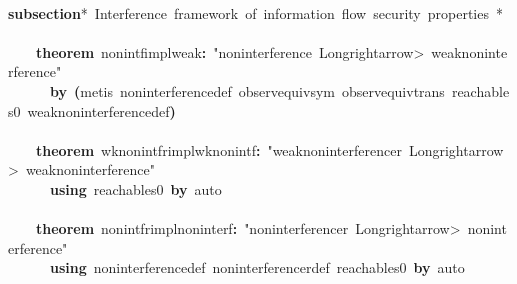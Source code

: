 \documentclass{article}
\newcommand{\syntaxCOMMENTC}[1]{\textcolor[rgb]{0.4,0.0,0.8}{#1}}
\newcommand{\syntaxKEYWORDA}[1]{\textcolor[rgb]{0.0,0.4,0.6}{\textbf{#1}}}
\newcommand{\syntaxLITERALA}[1]{\textcolor[rgb]{1.0,0.0,0.8}{#1}}
\newcommand{\syntaxOPERATOR}[1]{\textcolor[rgb]{0.0,0.0,0.0}{\textbf{#1}}}
\newcommand{\syntaxCOMMENTC}[1]{\textcolor[rgb]{0.4,0.0,0.8}{#1}}
\newcommand{\syntaxKEYWORDA}[1]{\textcolor[rgb]{0.0,0.4,0.6}{\textbf{#1}}}
\newcommand{\syntaxLITERALA}[1]{\textcolor[rgb]{1.0,0.0,0.8}{#1}}
\newcommand{\syntaxOPERATOR}[1]{\textcolor[rgb]{0.0,0.0,0.0}{\textbf{#1}}}
\newcommand{\syntaxCOMMENTC}[1]{\textcolor[rgb]{0.4,0.0,0.8}{#1}}
\newcommand{\syntaxKEYWORDA}[1]{\textcolor[rgb]{0.0,0.4,0.6}{\textbf{#1}}}
\newcommand{\syntaxLITERALA}[1]{\textcolor[rgb]{1.0,0.0,0.8}{#1}}
\newcommand{\syntaxOPERATOR}[1]{\textcolor[rgb]{0.0,0.0,0.0}{\textbf{#1}}}
\newcommand{\syntaxCOMMENTC}[1]{\textcolor[rgb]{0.4,0.0,0.8}{\textbf{#1}}}
\newcommand{\syntaxKEYWORDA}[1]{\textcolor[rgb]{0.0,0.4,0.6}{#1}}
\newcommand{\syntaxLITERALA}[1]{\textcolor[rgb]{1.0,0.0,0.8}{\textbf{#1}}}
\newcommand{\syntaxOPERATOR}[1]{\textcolor[rgb]{0.0,0.0,0.0}{#1}}
\newcommand{\syntaxCOMMENTC}[1]{\textcolor[rgb]{0.4,0.0,0.8}{#1}}
\newcommand{\syntaxKEYWORDA}[1]{\textcolor[rgb]{0.0,0.4,0.6}{\textbf{#1}}}
\newcommand{\syntaxLITERALA}[1]{\textcolor[rgb]{1.0,0.0,0.8}{#1}}
\newcommand{\syntaxOPERATOR}[1]{\textcolor[rgb]{0.0,0.0,0.0}{\textbf{#1}}}
\newcommand{\syntaxCOMMENTC}[1]{\textcolor[rgb]{0.4,0.0,0.8}{#1}}
\newcommand{\syntaxKEYWORDA}[1]{\textcolor[rgb]{0.0,0.4,0.6}{\textbf{#1}}}
\newcommand{\syntaxLITERALA}[1]{\textcolor[rgb]{1.0,0.0,0.8}{#1}}
\newcommand{\syntaxOPERATOR}[1]{\textcolor[rgb]{0.0,0.0,0.0}{\textbf{#1}}}
\begin{document}
\hspace*{\fill}\\
\syntaxKEYWORDA{subsection}\syntaxCOMMENTC{\usebox{\opencurlybracket}*{\ }Interference{\ }framework{\ }of{\ }information{\ }flow{\ }security{\ }properties{\ }*\usebox{\closecurlybracket}}\hspace*{\fill}\\
\hspace*{\fill}\\
{\ }{\ }{\ }{\ }\syntaxKEYWORDA{theorem}{\ }nonintf\usebox{\underscorebox}impl\usebox{\underscorebox}weak\syntaxOPERATOR{:}{\ }\syntaxLITERALA{"noninterference{\ }\<Longrightarrow>{\ }weak\usebox{\underscorebox}noninterference"}\hspace*{\fill}\\
{\ }{\ }{\ }{\ }{\ }{\ }\syntaxKEYWORDA{by}{\ }\syntaxOPERATOR{(}metis{\ }noninterference\usebox{\underscorebox}def{\ }observ\usebox{\underscorebox}equiv\usebox{\underscorebox}sym{\ }observ\usebox{\underscorebox}equiv\usebox{\underscorebox}trans{\ }reachable\usebox{\underscorebox}s0{\ }weak\usebox{\underscorebox}noninterference\usebox{\underscorebox}def\syntaxOPERATOR{)}{\ }{\ }{\ }{\ }{\ }{\ }{\ }\hspace*{\fill}\\
\hspace*{\fill}\\
{\ }{\ }{\ }{\ }\syntaxKEYWORDA{theorem}{\ }wk\usebox{\underscorebox}nonintf\usebox{\underscorebox}r\usebox{\underscorebox}impl\usebox{\underscorebox}wk\usebox{\underscorebox}nonintf\syntaxOPERATOR{:}{\ }\syntaxLITERALA{"weak\usebox{\underscorebox}noninterference\usebox{\underscorebox}r{\ }\<Longrightarrow>{\ }weak\usebox{\underscorebox}noninterference"}\hspace*{\fill}\\
{\ }{\ }{\ }{\ }{\ }{\ }\syntaxKEYWORDA{using}{\ }reachable\usebox{\underscorebox}s0{\ }\syntaxKEYWORDA{by}{\ }auto\hspace*{\fill}\\
{\ }{\ }\hspace*{\fill}\\
{\ }{\ }{\ }{\ }\syntaxKEYWORDA{theorem}{\ }nonintf\usebox{\underscorebox}r\usebox{\underscorebox}impl\usebox{\underscorebox}noninterf\syntaxOPERATOR{:}{\ }\syntaxLITERALA{"noninterference\usebox{\underscorebox}r{\ }\<Longrightarrow>{\ }noninterference"}\hspace*{\fill}\\
{\ }{\ }{\ }{\ }{\ }{\ }\syntaxKEYWORDA{using}{\ }noninterference\usebox{\underscorebox}def{\ }noninterference\usebox{\underscorebox}r\usebox{\underscorebox}def{\ }reachable\usebox{\underscorebox}s0{\ }\syntaxKEYWORDA{by}{\ }auto{\ }\hspace*{\fill}\\
\end{document}
